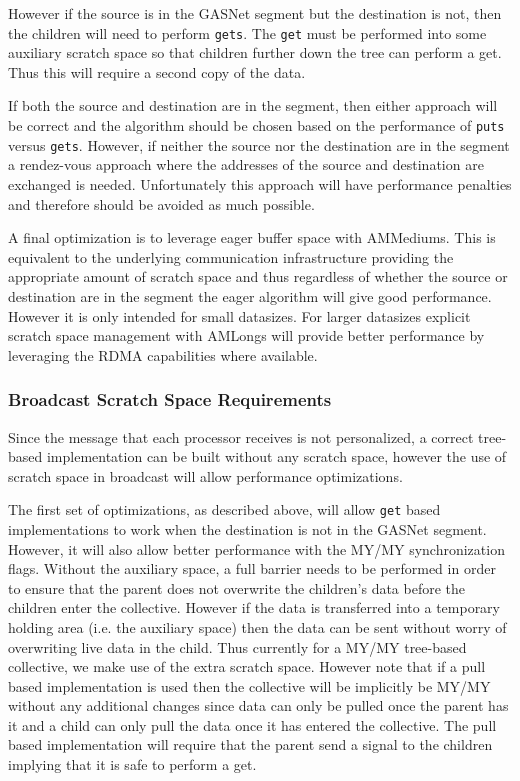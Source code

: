 \documentclass[times,10pt]{article}
\begin{document}
However if the source is in the GASNet segment but the destination is not, then the children will need to perform \texttt{gets}. The \texttt{get} must be performed into some auxiliary scratch space so that children further down the tree can perform a get. Thus this will require a second copy of the data.

If both the source and destination are in the segment, then either approach will be correct and the algorithm should be chosen based on the performance of \texttt{puts} versus \texttt{gets}. However, if neither the source nor the destination are in the segment a rendez-vous approach where the addresses of the source and destination are exchanged is needed. Unfortunately this approach will have performance penalties and therefore should be avoided as much possible. 

A final optimization is to leverage eager buffer space with AMMediums. This is equivalent to the underlying communication infrastructure providing the appropriate amount of scratch space and thus regardless of whether the source or destination are in the segment the eager algorithm will give good performance. However it is only intended for small datasizes. For larger datasizes explicit scratch space management with AMLongs will provide better performance by leveraging the RDMA capabilities where available. 


\subsubsection{Broadcast Scratch Space Requirements}
Since the message that each processor receives is not personalized, a correct tree-based implementation can be built without any scratch space, however the use of scratch space in broadcast will allow performance optimizations.

The first set of optimizations, as described above, will allow \texttt{get} based implementations to work when the destination is not in the GASNet segment. However, it will also allow better performance with the MY/MY synchronization flags. Without the auxiliary space, a full barrier needs to be performed in order to ensure that the parent does not overwrite the children's data before the children enter the collective. However if the data is transferred into a temporary holding area (i.e. the auxiliary space) then the data can be sent without worry of overwriting live data in the child. Thus currently for a MY/MY tree-based collective, we make use of the extra scratch space. However note that if a pull based implementation is used then the collective will be implicitly be MY/MY without any additional changes since data can only be pulled once the parent has it and a child can only pull the data once it has entered the collective. The pull based implementation will require that the parent send a signal to the children implying that it is safe to perform a get. 
\end{document}
